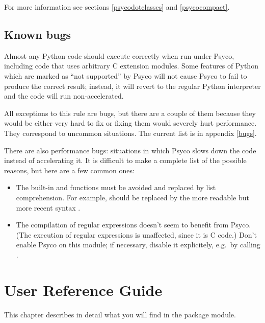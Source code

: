 \documentclass{manual}
\begin{document}
For more information see sections \ref{psycodotclasses} and \ref{psycocompact}.


\section{Known bugs}\label{tutknownbugs}

Almost any Python code should execute correctly when run under Psyco, including code that uses arbitrary C extension modules.  Some features of Python which are marked as ``not supported'' by Psyco will not cause Psyco to fail to produce the correct result; instead, it will revert to the regular Python interpreter and the code will run non-accelerated.

All exceptions to this rule are bugs, but there are a couple of them because they would be either very hard to fix or fixing them would severely hurt performance.  They correspond to uncommon situations.  The current list is in appendix \ref{bugs}.

There are also performance bugs: situations in which Psyco slows down the code instead of accelerating it.  It is difficult to make a complete list of the possible reasons, but here are a few common ones:

\begin{itemize}
\item The built-in  and  functions must be avoided and replaced by list comprehension.  For example,  should be replaced by the more readable but more recent syntax .
\item The compilation of regular expressions doesn't seem to benefit from Psyco.  (The execution of regular expressions is unaffected, since it is C code.)  Don't enable Psyco on this module; if necessary, disable it explicitely, e.g.\ by calling .
\end{itemize}



\chapter{User Reference Guide}


This chapter describes in detail what you will find in the  package module.
\end{document}
